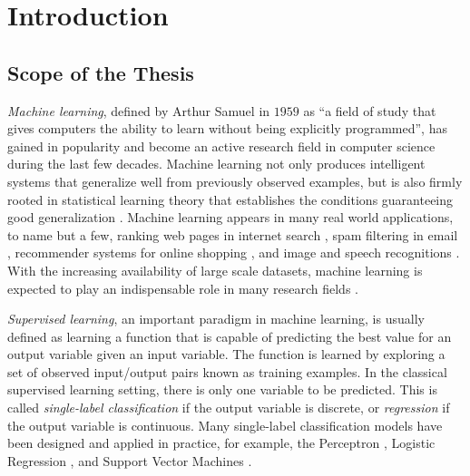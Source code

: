 




%
%
\chapter{Introduction}\label{ch_introduction}



%
%
\section{Scope of the Thesis}

\textit{Machine learning}, defined by Arthur Samuel in $1959$ as ``a field of study that gives computers the ability to learn without being explicitly programmed'', has gained in popularity and become an active research field in computer science during the last few decades.
Machine learning not only produces intelligent systems that generalize well from previously observed examples, but is also firmly rooted in statistical learning theory that establishes the conditions guaranteeing good generalization \citep{Vapnik98statistical,Vapnik99an}.
Machine learning appears in many real world applications, to name but a few, ranking web pages in internet search \citep{Richardson06beyond}, spam filtering in email \citep{Goodman06online}, recommender systems for online shopping \citep{Bell07lessons}, and image and speech recognitions \citep{Bengio09learning}.
With the increasing availability of large scale datasets, machine learning is expected to play an indispensable role in many research fields \citep{Fan13mining}.

\textit{Supervised learning}, an important paradigm in machine learning, is usually defined as learning a function that is capable of predicting the best value for an output variable given an input variable.
The function is learned by exploring a set of observed input/output pairs known as training examples.
In the classical supervised learning setting, there is only one variable to be predicted.
This is called \textit{single-label classification} if the output variable is discrete, or \textit{regression} if the output variable is continuous.
Many single-label classification models have been designed and applied in practice, for example, the Perceptron \citep{Rosenblatt58}, Logistic Regression \citep{Chen99}, and Support Vector Machines \citep{Cortes95support}.

